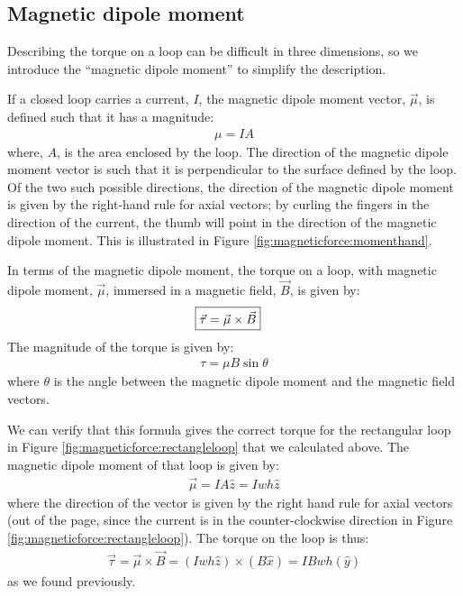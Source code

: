 \subsection{Magnetic dipole moment}
\label{sec:MagneticForce:dipolemoment}
Describing the torque on a loop can be difficult in three dimensions, so we introduce the ``magnetic dipole moment'' to simplify the description.

If a closed loop carries a current, $I$, the magnetic dipole moment vector, $\vec \mu$, is defined such that it has a magnitude:
\begin{align*}
\mu = IA
\end{align*}
where, $A$, is the area enclosed by the loop. The direction of the magnetic dipole moment vector is such that it is perpendicular to the surface defined by the loop. Of the two such possible directions, the direction of the magnetic dipole moment is given by the right-hand rule for axial vectors; by curling the fingers in the direction of the current, the thumb will point in the direction of the magnetic dipole moment. This is illustrated in Figure \ref{fig:magneticforce:momenthand}.

In terms of the magnetic dipole moment, the torque on a loop, with magnetic dipole moment, $\vec \mu$, immersed in a magnetic field, $\vec B$, is given by:
\begin{align*}
\Aboxed{\vec \tau = \vec \mu \times \vec B}
\end{align*}
The magnitude of the torque is given by:
\begin{align*}
\tau =\mu B \sin\theta
\end{align*}
where $\theta$ is the angle between the magnetic dipole moment and the magnetic field vectors.

We can verify that this formula gives the correct torque for the rectangular loop in Figure \ref{fig:magneticforce:rectangleloop} that we calculated above. The magnetic dipole moment of that loop is given by:
\begin{align*}
\vec \mu = IA \hat z = Iwh\hat z
\end{align*}
where the direction of the vector is given by the right hand rule for axial vectors (out of the page, since the current is in the counter-clockwise direction in Figure \ref{fig:magneticforce:rectangleloop}). The torque on the loop is thus:
\begin{align*}
\vec \tau = \vec \mu \times \vec B = (Iwh\hat z) \times (B\hat x) = IBwh (\hat y)
\end{align*}
as we found previously.

